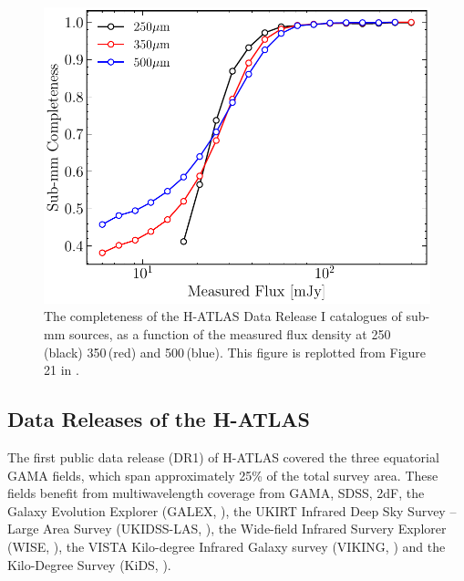 \begin{figure}
	\includegraphics[width=\columnwidth]{Figures/submm_completeness.pdf}
	\caption{The completeness of the H-ATLAS Data Release I catalogues of sub-mm sources, as a function of the measured flux density at 250\,\micron (black) 350\,\micron (red) and 500\,\micron (blue). This figure is replotted from Figure 21 in \citealt{Valiante_2016}.}
	\label{fig:submm_completeness}
\end{figure}

\subsection{Data Releases of the H-ATLAS}
\label{sec:Data Releases of the H-ATLAS}

The first public data release (DR1) of H-ATLAS covered the three equatorial GAMA fields, which span approximately 25\% of the total survey area. These fields benefit from multiwavelength coverage from GAMA, SDSS, 2dF, the Galaxy Evolution Explorer (GALEX, \citealt{Martin_2005}), the UKIRT Infrared Deep Sky Survey -- Large Area Survey (UKIDSS-LAS, \citealt{Lawrence_2007}), the Wide-field Infrared Survery Explorer (WISE, \citealt{Wright_2010}), the VISTA Kilo-degree Infrared Galaxy survey (VIKING, \citealt{Edge_2013}) and the Kilo-Degree Survey (KiDS, \citealt{deJong_2013}). 


